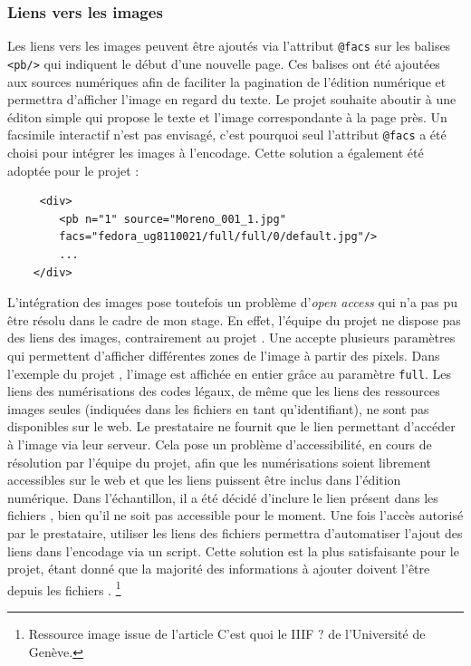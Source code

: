 \subsubsection{Liens vers les images}
Les liens vers les images peuvent être ajoutés via l'attribut \texttt{@facs} sur les balises \texttt{<pb/>} qui indiquent le début d'une nouvelle page. Ces balises ont été ajoutées aux sources numériques afin de faciliter la pagination de l'édition numérique et permettra d'afficher l'image en regard du texte. Le projet \COREL souhaite aboutir à une éditon simple qui propose le texte et l'image correspondante à la page près. Un facsimile interactif n'est pas envisagé, c'est pourquoi seul l'attribut \texttt{@facs} a été choisi pour intégrer les images à l'encodage. Cette solution a également été adoptée pour le projet \cordel : 
\begin{verbatim}
     <div>
        <pb n="1" source="Moreno_001_1.jpg" 
        facs="fedora_ug8110021/full/full/0/default.jpg"/>
        ...
    </div>
\end{verbatim}

L'intégration des images pose toutefois un problème d'\textit{open access} qui n'a pas pu être résolu dans le cadre de mon stage. En effet, l'équipe du projet ne dispose pas des liens \IIIF des images, contrairement au projet \cordel. Une \URL \IIIF accepte plusieurs paramètres qui permettent d'afficher différentes zones de l'image à partir des pixels. Dans l'exemple du projet \cordel, l'image est affichée en entier grâce au paramètre \texttt{full}. Les liens \IIIF des numérisations des codes légaux, de même que les liens des ressources images seules (indiquées dans les fichiers \JSON en tant qu'identifiant), ne sont pas disponibles sur le web. Le prestataire ne fournit que le lien permettant d'accéder à l'image via leur serveur. Cela pose un problème d'accessibilité, en cours de résolution par l'équipe du projet, afin que les numérisations soient librement accessibles sur le web et que les liens puissent être inclus dans l'édition numérique. Dans l'échantillon, il a été décidé d'inclure le lien présent dans les fichiers \JSON, bien qu'il ne soit pas accessible pour le moment. Une fois l'accès autorisé par le prestataire, utiliser les liens des fichiers \JSON permettra d'automatiser l'ajout des liens dans l'encodage via un script. Cette solution est la plus satisfaisante pour le projet, étant donné que la majorité des informations à ajouter doivent l'être depuis les fichiers \JSON. \footnote{Ressource image issue de l'article \og C'est quoi le IIIF ? \fg de l'Université de Genève.}

